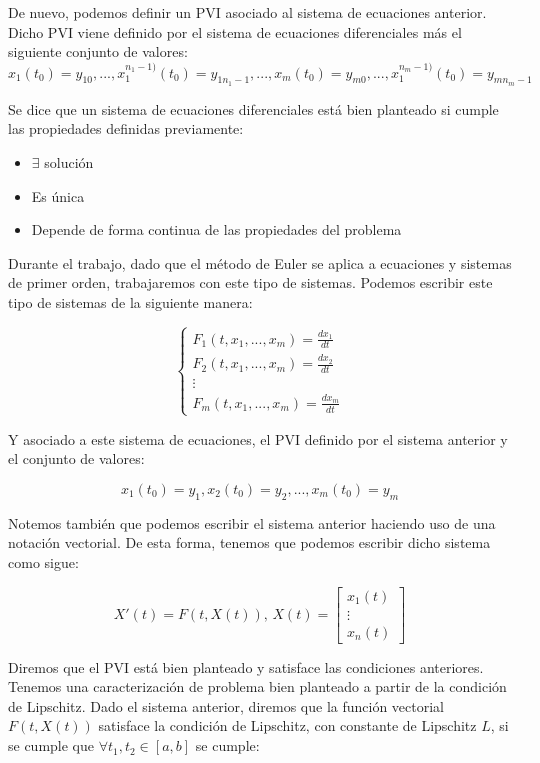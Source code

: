 \documentclass[12pt]{article}       %
\begin{document}
De nuevo, podemos definir un PVI asociado al sistema de ecuaciones anterior. Dicho PVI viene definido por el sistema de ecuaciones diferenciales más el siguiente conjunto de valores:
$$ x_1(t_0) = y_{10}, ..., x_1^{n_1-1)}(t_0) = y_{1n_1-1}, ..., x_m(t_0) = y_{m0}, ..., x_1^{n_m-1)}(t_0) = y_{mn_m-1} $$

Se dice que un sistema de ecuaciones diferenciales está bien planteado si cumple las propiedades definidas previamente:

\begin{itemize}
\item $\exists$ solución
\item Es única
\item Depende de forma continua de las propiedades del problema
\end{itemize}

Durante el trabajo, dado que el método de Euler se aplica a ecuaciones y sistemas de primer orden, trabajaremos con este tipo de sistemas. Podemos escribir este tipo de sistemas de la siguiente manera:

$$
\begin{cases}
F_1(t, x_1, ..., x_m) = \frac{d x_1}{d t} \\
F_2(t, x_1, ..., x_m) = \frac{d x_2}{d t} \\
\vdots \\
F_m(t, x_1, ..., x_m) = \frac{d x_m}{d t}
\end{cases}
$$

Y asociado a este sistema de ecuaciones, el PVI definido por el sistema anterior y el conjunto de valores:

$$ x_1(t_0) = y_1, x_2(t_0) = y_2, ..., x_m(t_0) = y_m $$

Notemos también que podemos escribir el sistema anterior haciendo uso de una notación vectorial. De esta forma, tenemos que podemos escribir dicho sistema como sigue:

$$
X'(t)=F(t,X(t)), \, 
X(t)=\begin{bmatrix}
    x_1(t) \\
    \vdots \\
    x_n(t)
    \end{bmatrix}
$$

Diremos que el PVI está bien planteado y satisface las condiciones anteriores. Tenemos una caracterización de problema bien planteado a partir de la condición de Lipschitz. Dado el sistema anterior, diremos que la función vectorial $F(t, X(t))$ satisface la condición de Lipschitz, con constante de Lipschitz $L$, si se cumple que $\forall t_1, t_2 \in [a,b]$ se cumple:
\end{document}
